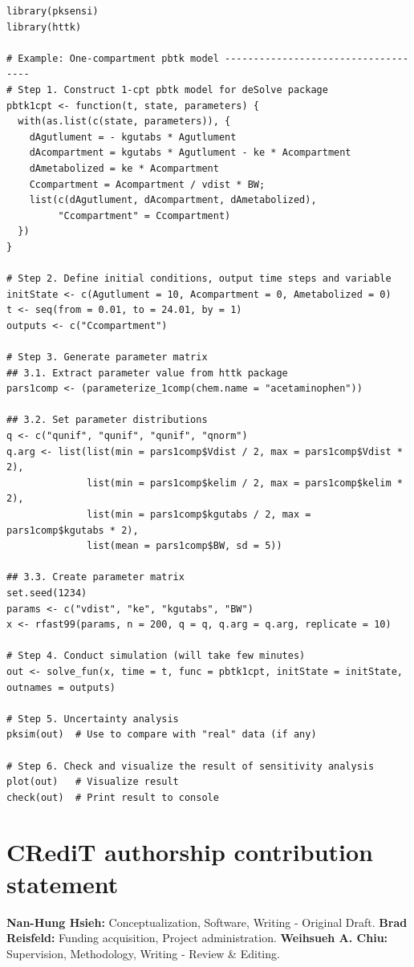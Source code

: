 \documentclass[preprint,12pt, a4paper]{elsarticle}
\begin{document}
\begin{lstlisting}
library(pksensi)
library(httk)

# Example: One-compartment pbtk model ------------------------------------
# Step 1. Construct 1-cpt pbtk model for deSolve package
pbtk1cpt <- function(t, state, parameters) {
  with(as.list(c(state, parameters)), {
    dAgutlument = - kgutabs * Agutlument
    dAcompartment = kgutabs * Agutlument - ke * Acompartment
    dAmetabolized = ke * Acompartment
    Ccompartment = Acompartment / vdist * BW;
    list(c(dAgutlument, dAcompartment, dAmetabolized), 
         "Ccompartment" = Ccompartment) 
  })
}

# Step 2. Define initial conditions, output time steps and variable
initState <- c(Agutlument = 10, Acompartment = 0, Ametabolized = 0)
t <- seq(from = 0.01, to = 24.01, by = 1)
outputs <- c("Ccompartment")

# Step 3. Generate parameter matrix 
## 3.1. Extract parameter value from httk package
pars1comp <- (parameterize_1comp(chem.name = "acetaminophen"))

## 3.2. Set parameter distributions
q <- c("qunif", "qunif", "qunif", "qnorm")
q.arg <- list(list(min = pars1comp$Vdist / 2, max = pars1comp$Vdist * 2),
              list(min = pars1comp$kelim / 2, max = pars1comp$kelim * 2),
              list(min = pars1comp$kgutabs / 2, max = pars1comp$kgutabs * 2),
              list(mean = pars1comp$BW, sd = 5))

## 3.3. Create parameter matrix
set.seed(1234)
params <- c("vdist", "ke", "kgutabs", "BW")
x <- rfast99(params, n = 200, q = q, q.arg = q.arg, replicate = 10)

# Step 4. Conduct simulation (will take few minutes)
out <- solve_fun(x, time = t, func = pbtk1cpt, initState = initState, outnames = outputs)

# Step 5. Uncertainty analysis
pksim(out)  # Use to compare with "real" data (if any)

# Step 6. Check and visualize the result of sensitivity analysis
plot(out)   # Visualize result
check(out)  # Print result to console
\end{lstlisting}

\section*{CRediT authorship contribution statement}

\textbf{Nan-Hung Hsieh:} Conceptualization, Software, Writing - Original Draft.
\textbf{Brad Reisfeld:} Funding acquisition, Project administration. 
\textbf{Weihsueh A. Chiu:} Supervision, Methodology, Writing - Review \& Editing. 
\end{document}
